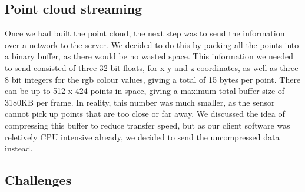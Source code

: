 \documentclass{article}
\begin{document}
\subsection{Point cloud streaming}
Once we had built the point cloud, the next step was to send the information over a network to the server. We decided to do this by packing all the points into a binary buffer, as there would be no wasted space. This information we needed to send consisted of three 32 bit floats, for x y and z coordinates, as well as three 8 bit integers for the rgb colour values, giving a total of 15 bytes per point. There can be up to 512 x 424 points in space, giving a maximum total buffer size of 3180KB per frame. In reality, this number was much smaller, as the sensor cannot pick up points that are too close or far away. We discussed the idea of compressing this buffer to reduce transfer speed, but as our client software was reletively CPU intensive already, we decided to send the uncompressed data instead.

\subsection{Challenges}
\end{document}

